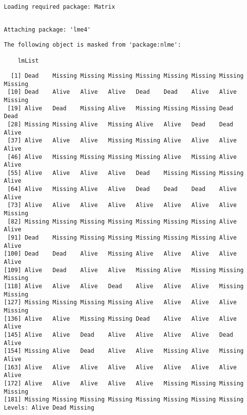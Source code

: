 \documentclass[
  letterpaper,
  DIV=11,
  numbers=noendperiod]{scrartcl}
\newenvironment{Shaded}{\begin{snugshade}}{\end{snugshade}}
\newcommand{\NormalTok}[1]{\textcolor[rgb]{0.00,0.23,0.31}{#1}}
\newcommand{\SpecialCharTok}[1]{\textcolor[rgb]{0.37,0.37,0.37}{#1}}
\begin{document}
\begin{verbatim}
Loading required package: Matrix
\end{verbatim}

\begin{verbatim}

Attaching package: 'lme4'
\end{verbatim}

\begin{verbatim}
The following object is masked from 'package:nlme':

    lmList
\end{verbatim}

\begin{Shaded}
\end{Shaded}

\begin{verbatim}
  [1] Dead    Missing Missing Missing Missing Missing Missing Missing Missing
 [10] Dead    Alive   Alive   Alive   Dead    Dead    Alive   Alive   Missing
 [19] Alive   Dead    Missing Alive   Missing Missing Missing Dead    Dead   
 [28] Missing Missing Alive   Missing Alive   Alive   Dead    Dead    Alive  
 [37] Alive   Alive   Alive   Missing Missing Alive   Alive   Alive   Alive  
 [46] Alive   Missing Missing Missing Missing Alive   Missing Alive   Alive  
 [55] Alive   Alive   Alive   Alive   Dead    Missing Missing Missing Alive  
 [64] Alive   Missing Alive   Alive   Dead    Dead    Dead    Alive   Alive  
 [73] Alive   Alive   Alive   Alive   Alive   Alive   Alive   Alive   Missing
 [82] Missing Missing Missing Missing Missing Missing Missing Alive   Alive  
 [91] Dead    Missing Missing Missing Missing Missing Missing Alive   Alive  
[100] Dead    Dead    Alive   Missing Alive   Alive   Alive   Alive   Alive  
[109] Alive   Dead    Alive   Alive   Missing Alive   Missing Missing Missing
[118] Alive   Alive   Alive   Dead    Alive   Alive   Alive   Missing Missing
[127] Missing Missing Missing Missing Alive   Alive   Alive   Alive   Missing
[136] Alive   Alive   Missing Missing Dead    Alive   Alive   Alive   Alive  
[145] Alive   Alive   Dead    Alive   Alive   Alive   Alive   Dead    Alive  
[154] Missing Alive   Dead    Alive   Alive   Missing Alive   Missing Alive  
[163] Alive   Alive   Alive   Alive   Alive   Alive   Alive   Alive   Alive  
[172] Alive   Alive   Alive   Alive   Alive   Missing Missing Missing Missing
[181] Missing Missing Missing Missing Missing Missing Missing Missing
Levels: Alive Dead Missing
\end{verbatim}
\end{document}
